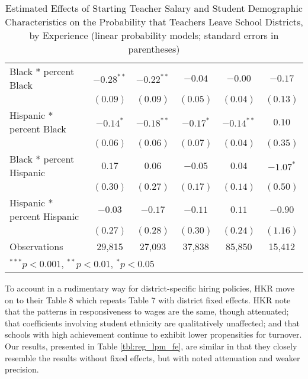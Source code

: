 \documentclass[]{article}
\begin{document}
\begin{table}
\begin{center}
\begin{tabular}{l c c c c c }
\quad Black * percent Black                 & $-0.28^{**}$ & $-0.22^{**}$ & $-0.04$       & $-0.00$      & $-0.17$     \\
                                            & $(0.09)$     & $(0.09)$     & $(0.05)$      & $(0.04)$     & $(0.13)$    \\
\quad Hispanic * percent Black              & $-0.14^{*}$  & $-0.18^{**}$ & $-0.17^{*}$   & $-0.14^{**}$ & $0.10$      \\
                                            & $(0.06)$     & $(0.06)$     & $(0.07)$      & $(0.04)$     & $(0.35)$    \\
\quad Black * percent Hispanic              & $0.17$       & $0.06$       & $-0.05$       & $0.04$       & $-1.07^{*}$ \\
                                            & $(0.30)$     & $(0.27)$     & $(0.17)$      & $(0.14)$     & $(0.50)$    \\
\quad Hispanic * percent Hispanic           & $-0.03$      & $-0.17$      & $-0.11$       & $0.11$       & $-0.90$     \\
                                            & $(0.27)$     & $(0.28)$     & $(0.30)$      & $(0.24)$     & $(1.16)$    \\
\hline
Observations                                & 29,815        & 27,093        & 37,838         & 85,850        & 15,412       \\
\hline
\multicolumn{6}{l}{\scriptsize{$^{***}p<0.001$, $^{**}p<0.01$, $^*p<0.05$}}
\end{tabular}
\caption{Estimated Effects of Starting Teacher Salary and Student Demographic Characteristics on the Probability that Teachers Leave School Districts, by Experience (linear probability models; standard errors in parentheses)}
\label{tbl:reg_lpm}
\end{center}
\end{table}

To account in a rudimentary way for district-specific hiring policies,
HKR move on to their Table 8 which repeats Table 7 with district fixed
effects. HKR note that the patterns in responsiveness to wages are the
same, though attenuated; that coefficients involving student ethnicity
are qualitatively unaffected; and that schools with high achievement
continue to exhibit lower propensities for turnover. Our results,
presented in Table \ref{tbl:reg_lpm_fe}, are similar in that they
closely resemble the results without fixed effects, but with noted
attenuation and weaker precision.
\end{document}
